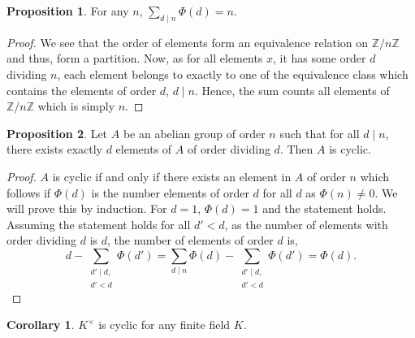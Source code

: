 \documentclass[]{article}
\theoremstyle{definition}
\newtheorem{corollary}{Corollary}[theorem]
\theoremstyle{definition}
\newtheorem{proposition}{Proposition}[section]
\begin{document}
\begin{proposition}
  For any \(n\), \(\sum_{d \mid n} \Phi(d) = n\).
\end{proposition}
\begin{proof}
  We see that the order of elements form an equivalence relation on 
  \(\mathbb{Z}/n\mathbb{Z}\) and thus, form a partition. Now, as for all 
  elements \(x\), it has some order \(d\) dividing \(n\), each element belongs 
  to exactly to one of the equivalence class which contains the elements of 
  order \(d\), \(d \mid n\). Hence, the sum counts all elements of 
  \(\mathbb{Z}/n\mathbb{Z}\) which is simply \(n\).
\end{proof}

\begin{proposition}
  Let \(A\) be an abelian group of order \(n\) such that for all \(d \mid n\), 
  there exists exactly \(d\) elements of \(A\) of order dividing \(d\). Then 
  \(A\) is cyclic.
\end{proposition}
\begin{proof}
  \(A\) is cyclic if and only if there exists an element in \(A\) of order 
  \(n\) which follows if \(\Phi(d)\) is the number elements of order 
  \(d\) for all \(d\) as \(\Phi(n) \neq 0\). We will prove this by induction. 
  For \(d = 1\), \(\Phi(d) = 1\) and the statement holds. Assuming the statement 
  holds for all \(d' < d\), as the number of elements with order dividing 
  \(d\) is \(d\), the number of elements of order \(d\) is,
  \[d - \sum_{\substack{d' \mid d, \\ d' < d}} \Phi(d') = 
  \sum_{d \mid n} \Phi(d) - \sum_{\substack{d' \mid d, \\ d' < d}} \Phi(d')
  = \Phi(d).\]
\end{proof}

\begin{corollary}
  \(K^\times\) is cyclic for any finite field \(K\).
\end{corollary}
\end{document}
